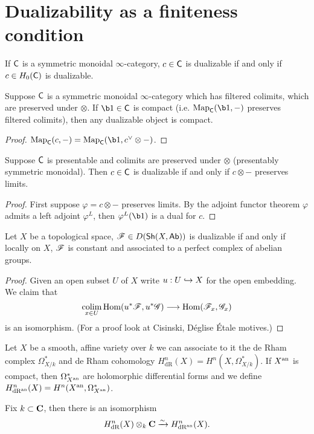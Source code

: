 \section{Dualizability as a finiteness condition}
\begin{definition}
	If $\mathsf{C}$ is a symmetric monoidal $\infty$-category, $c\in \mathsf{C}$ is dualizable if and only if $c\in H_0(\mathsf{C})$ is dualizable.
\end{definition}
\begin{lemma}
	Suppose $\mathsf{C}$ is a symmetric monoidal $\infty$-category which has filtered colimits, which are preserved under $\otimes$. If $\b1\in \C$ is compact (i.e. $\Map_{\C}(\b1,-)$ preserves filtered colimits), then any dualizable object is compact.
\end{lemma}
\begin{proof}
	$\Map_{\C}(c,-)=\Map_{\C}(\b1, c^{\vee}\otimes -)$.
\end{proof}
\begin{lemma}
	Suppose $\mathsf{C}$ is presentable and colimits are preserved under $\otimes$ (presentably symmetric monoidal). Then $c\in \mathsf{C}$ is dualizable if and only if $c\otimes -$ preserves limits.
\end{lemma}
\begin{proof}
	First suppose $\varphi=c\otimes -$ preserves limits. By the adjoint functor theorem $\varphi$ admits a left adjoint $\varphi^{L}$, then $\varphi^{L}(\b1)$ is a dual for $c$. 
\end{proof}
\begin{lemma}
	Let $X$ be a topological space, $\mathscr{F}\in D(\mathsf{Sh}(X,\mathsf{Ab}))$ is dualizable if and only if locally on $X$, $\mathscr{F}$ is constant and associated to a perfect complex of abelian groups.
\end{lemma}
\begin{proof}
	Given an open subset $U$ of $X$ write $u:U\hookrightarrow X$ for the open embedding. We claim that
	\[
	\colim_{x\in U}\Hom(u^{*}\CF,u^{*}\CG)\to \Hom(\CF_x, \CG_x)
	\] 
	is an isomorphism. (For a proof look at Cisinski, D\'eglise \'Etale motives.)
\end{proof}
Let $X$ be a smooth, affine variety over $k$ we can associate to it the de Rham complex $\Omega_{X /k}^{*}$ and de Rham cohomology $H_{\text{dR}}^{n}(X)=H^{n}(X,\Omega_{X /k}^{*})$. If $X^{\text{an}}$ is compact, then $\Omega_{X^{\text{an}}}^{*}$ are holomorphic differential forms and we define $H_{\text{dR}^{\text{an}}}^{n}(X) = H^{n}(X^{\text{an}},\Omega^{*}_{X^{\text{an}}})$.
\begin{theorem}
	Fix $k\subset \mathbf{C}$, then there is an isomorphism
	\[
		H_{\text{dR}}^{n}(X)\otimes_k \mathbf{C} \xrightarrow{\sim} H_{\text{dR}^{\text{an}}}^{n}(X)
	.\] 	
\end{theorem}
